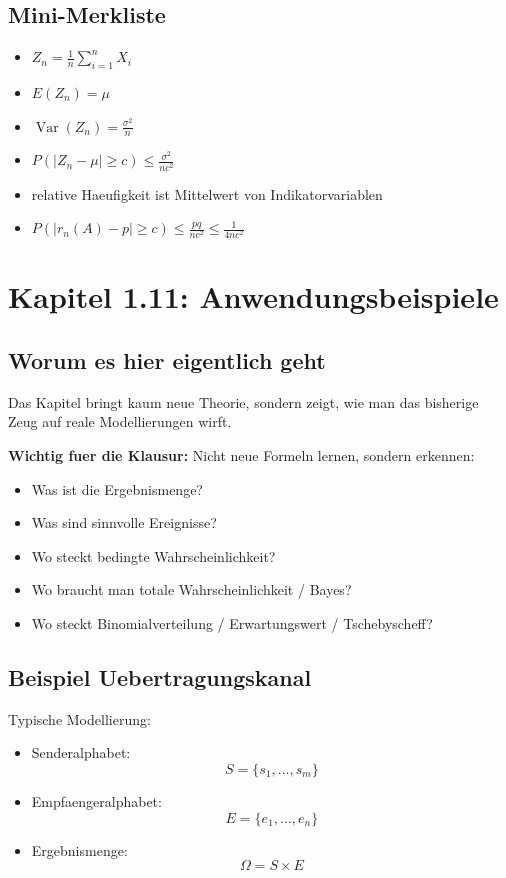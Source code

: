 \documentclass[a4paper,11pt]{article}
\begin{document}
\subsection{Mini-Merkliste}
\begin{itemize}
  \item $\displaystyle Z_n=\frac1n\sum_{i=1}^n X_i$
  \item $\displaystyle E(Z_n)=\mu$
  \item $\displaystyle \operatorname{Var}(Z_n)=\frac{\sigma^2}{n}$
  \item $\displaystyle P(|Z_n-\mu|\ge c)\le \frac{\sigma^2}{nc^2}$
  \item relative Haeufigkeit ist Mittelwert von Indikatorvariablen
  \item $\displaystyle P(|r_n(A)-p|\ge c)\le \frac{pq}{nc^2}\le \frac{1}{4nc^2}$
\end{itemize}

\section{Kapitel 1.11: Anwendungsbeispiele}

\subsection{Worum es hier eigentlich geht}
Das Kapitel bringt kaum neue Theorie, sondern zeigt, wie man das bisherige Zeug auf reale Modellierungen wirft.

\textbf{Wichtig fuer die Klausur:}
Nicht neue Formeln lernen, sondern erkennen:
\begin{itemize}
  \item Was ist die Ergebnismenge?
  \item Was sind sinnvolle Ereignisse?
  \item Wo steckt bedingte Wahrscheinlichkeit?
  \item Wo braucht man totale Wahrscheinlichkeit / Bayes?
  \item Wo steckt Binomialverteilung / Erwartungswert / Tschebyscheff?
\end{itemize}

\subsection{Beispiel Uebertragungskanal}
Typische Modellierung:
\begin{itemize}
  \item Senderalphabet:
  \[
  S=\{s_1,\dots,s_m\}
  \]
  \item Empfaengeralphabet:
  \[
  E=\{e_1,\dots,e_n\}
  \]
  \item Ergebnismenge:
  \[
  \Omega=S\times E
  \]
\end{itemize}
\end{document}
